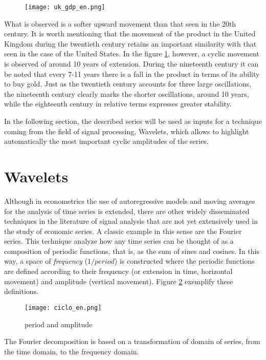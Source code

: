 \documentclass[a4paper]{article}
\begin{document}
\begin{figure}[H]
	\centering
	\texttt{[image: uk\_gdp\_en.png]}
	\caption{} 
	\label{fig:uk_gdp}
\end{figure}


What is observed is a softer upward movement than that seen in the 20th century. It is worth mentioning that the movement of the product in the United Kingdom during the twentieth century retains an important similarity with that seen in the case of the United States. In the figure \ref{fig:uk_gdp}, however, a cyclic movement is observed of around 10 years of extension. During the nineteenth century it can be noted that every 7-11 years there is a fall in the product in terms of its ability to buy gold. Just as the twentieth century accounts for three large oscillations, the nineteenth century clearly marks the shorter oscillations, around 10 years, while the eighteenth century in relative terms expresses greater stability.

In the following section, the described series will be used as inputs for a technique coming from the field of signal processing, Wavelets, which allows to highlight automatically the most important cyclic amplitudes of the series.

\section{Wavelets}

Although in econometrics the use of autoregressive models and moving averages for the analysis of time series is extended, there are other widely disseminated techniques in the literature of signal analysis that are not yet extensively used in the study of economic series. A classic example in this sense are the Fourier series. This technique analyze how any time series can be thought of as a composition of periodic functions, that is, as the sum of sines and cosines. In this way, a space of \textit{frequency} ($1/period$) is constructed where the periodic functions are defined according to their frequency (or extension in time, horizontal movement) and amplitude (vertical movement). Figure \ref{fig:ciclo} exemplify these definitions.


\begin{figure}[H]
	\centering
	\texttt{[image: ciclo\_en.png]}
	\caption{period and amplitude} \label{fig:ciclo}
\end{figure}

The Fourier decomposition is based on a transformation of domain of series, from the time domain, to the frequency domain.
\\
\end{document}
